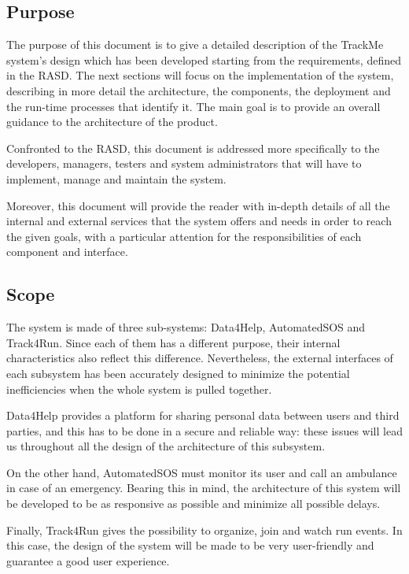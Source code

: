 \subsection{Purpose}
The purpose of this document is to give a detailed description of the TrackMe system's design which has been developed starting from the requirements, defined in the RASD. The next sections will focus on the implementation of the system, describing in more detail the architecture, the components, the deployment  and the run-time processes that identify it.
The main goal is to provide an overall guidance to the architecture of the product.

Confronted to the RASD, this document is addressed more specifically to the developers, managers, testers and system administrators that will have to implement, manage and maintain the system.

Moreover, this document will provide the reader with in-depth details of all the internal and external services that the system offers and needs in order to reach the given goals, with a particular attention for the responsibilities of each component and interface.
 
\subsection{Scope}

The system is made of three sub-systems: Data4Help, AutomatedSOS and Track4Run. 
Since each of them has a different purpose, their internal characteristics also reflect this difference. Nevertheless, the external interfaces of each subsystem has been accurately designed to minimize the potential inefficiencies when the whole system is pulled together.

Data4Help provides a platform for sharing personal data between users and third parties, and this has to be done in a secure and reliable way: these issues will lead us throughout all the design of the architecture of this subsystem.

On the other hand, AutomatedSOS must monitor its user and call an ambulance in case of an emergency. Bearing this in mind, the architecture of this system will be developed to be as responsive as possible and minimize all possible delays.

Finally, Track4Run gives the possibility to organize, join and watch run events. In this case, the design of the system will be made to be very user-friendly and guarantee a good user experience.

